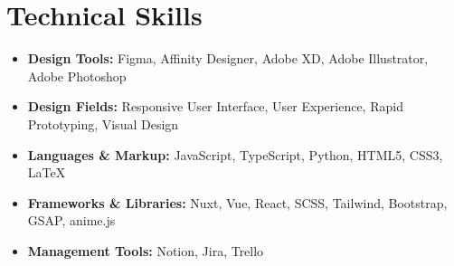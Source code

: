 \section*{Technical Skills}
%
%
%
\begin{itemize}
	\item \textbf{Design Tools:} Figma, Affinity Designer, Adobe XD, Adobe Illustrator, Adobe Photoshop
	\item \textbf{Design Fields:} Responsive User Interface, User Experience, Rapid Prototyping, Visual Design
	\item \textbf{Languages \& Markup:} JavaScript, TypeScript, Python, HTML5, CSS3, LaTeX
	\item \textbf{Frameworks \& Libraries:} Nuxt, Vue, React, SCSS, Tailwind, Bootstrap, GSAP, anime.js
	\item \textbf{Management Tools:} Notion, Jira, Trello
\end{itemize}

